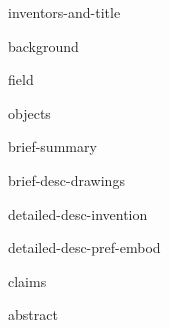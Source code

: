 \documentclass[english]{patentex}
\begin{document}
{inventors-and-title}

\maketitle

\tableofcontents

{background}

{field}

{objects}

{brief-summary}

{brief-desc-drawings}

{detailed-desc-invention}

{detailed-desc-pref-embod}

{claims}

{abstract}
\end{document}

